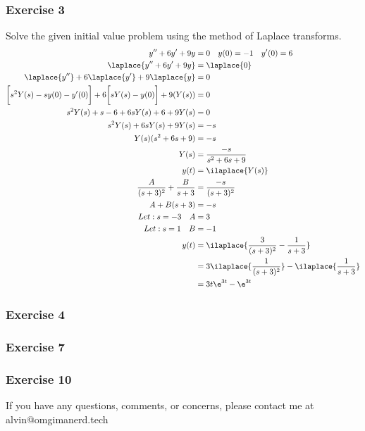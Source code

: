 \documentclass{math}
\begin{document}
\subsubsection*{Exercise 3}
Solve the given initial value problem using the method of Laplace transforms.
\begin{align*}
  y''+6y'+9y &= 0 \quad y(0) = -1 \quad y'(0) = 6 \\
  \laplace{y''+6y'+9y} &= \laplace{0} \\
  \laplace{y''}+6\laplace{y'}+9\laplace{y} &= 0 \\
  \bigg[s^2Y(s)-sy(0)-y'(0)\bigg]+6\bigg[sY(s)-y(0)\bigg]+9(Y(s)) &= 0 \\
  s^2Y(s)+s-6+6sY(s)+6+9Y(s) &= 0 \\
  s^2Y(s)+6sY(s)+9Y(s) &= -s \\
  Y(s)(s^2+6s+9) &= -s \\
  Y(s) &= \frac{-s}{s^2+6s+9} \\
  y(t) &= \ilaplace{Y(s)} \\
  \frac{A}{(s+3)^2}+\frac{B}{s+3} &= \frac{-s}{(s+3)^2} \\
  A+B(s+3) &= -s \\
  Let: s = -3 \quad A &= 3 \\
  Let: s = 1 \quad B &= -1 \\
  y(t) &= \ilaplace{\frac{3}{(s+3)^2}-\frac{1}{s+3}} \\
  &= 3\ilaplace{\frac{1}{(s+3)^2}}-\ilaplace{\frac{1}{s+3}} \\
  &= 3t\e^{3t}-\e^{3t}
\end{align*}

\subsubsection*{Exercise 4}
\subsubsection*{Exercise 7}
\subsubsection*{Exercise 10}

\begin{center}
  If you have any questions, comments, or concerns, please contact me at
  alvin@omgimanerd.tech
\end{center}
\end{document}
